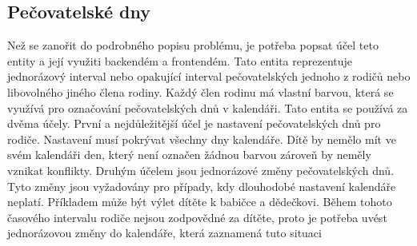         \subsection{Pečovatelské dny}\label{analyza:pozadavky:caredays}
            Než se zanořit do podrobného popisu problému, je potřeba popsat účel teto entity a její využiti backendém a frontendém. Tato entita reprezentuje jednorázový interval nebo opakující interval pečovatelských jednoho z rodičů nebo libovolného jiného člena rodiny. Každý člen rodinu má vlastní barvou, která se využívá pro označování pečovatelských dnů v kalendáři. Tato entita se používá za dvěma účely. První a nejdůležitější účel je nastavení pečovatelských dnů pro rodiče. Nastavení musí pokrývat všechny dny kalendáře. Dítě by nemělo mít ve svém kalendáři den, který není označen žádnou barvou zároveň by neměly vznikat konflikty. Druhým účelem jsou jednorázové změny pečovatelských dnů. Tyto změny jsou vyžadovány pro případy, kdy dlouhodobé nastavení kalendáře neplatí. Příkladem může být výlet dítěte k babičce a dědečkovi. Během tohoto časového intervalu rodiče nejsou zodpovědné za dítěte, proto je potřeba uvést jednorázovou změny do kalendáře, která zaznamená tuto situaci 
            
